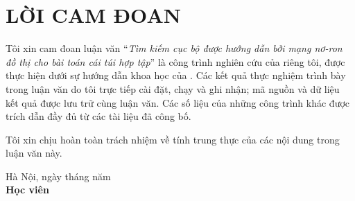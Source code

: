 \section*{\centering LỜI CAM ĐOAN}

Tôi xin cam đoan luận văn ``\textit{Tìm kiếm cục bộ được hướng dẫn bởi mạng nơ-ron đồ thị cho bài toán cái túi hợp tập}'' là công trình nghiên cứu của riêng tôi, được thực hiện dưới sự hướng dẫn khoa học của \gvhd. Các kết quả thực nghiệm trình bày trong luận văn do tôi trực tiếp cài đặt, chạy và ghi nhận; mã nguồn và dữ liệu kết quả được lưu trữ cùng luận văn. Các số liệu của những công trình khác được trích dẫn đầy đủ từ các tài liệu đã công bố.

Tôi xin chịu hoàn toàn trách nhiệm về tính trung thực của các nội dung trong luận văn này.

\vspace{1cm}
\begin{flushright}
\begin{minipage}{7cm}
\centering
Hà Nội, ngày  tháng  năm \namhoc\\
\textbf{Học viên}\\[2.5cm]
\textbf{\tacgia}
\end{minipage}
\end{flushright}

\newpage
